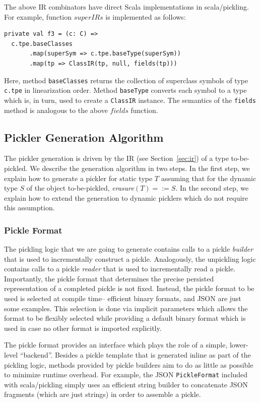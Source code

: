 \documentclass[10pt]{sigplanconf}
\theoremstyle{definition}
\theoremstyle{definition}
\newcommand{\term}[1]{\mbox{\texttt{#1}}}
\begin{document}
The above IR combinators have direct Scala implementations in scala/pickling.
For example, function $superIRs$ is implemented as follows:

\begin{lstlisting}
private val f3 = (c: C) =>
  c.tpe.baseClasses
       .map(superSym => c.tpe.baseType(superSym))
       .map(tp => ClassIR(tp, null, fields(tp)))
\end{lstlisting}
\noindent
Here, method \verb|baseClasses| returns the collection of superclass symbols
of type \verb|c.tpe| in linearization order. Method \verb|baseType| converts
each symbol to a type which is, in turn, used to create a \verb|ClassIR|
instance. The semantics of the \verb|fields| method is analogous to the above
$fields$ function.

\subsection{Pickler Generation Algorithm}

The pickler generation is driven by the IR (see Section~\ref{sec:ir}) of a
type to-be-pickled. We describe the generation algorithm in two steps. In the
first step, we explain how to generate a pickler for static type $T$ assuming
that for the dynamic type $S$ of the object to-be-pickled,
\textit{erasure}$(T) =:= S$. In the second step, we explain how to extend the
generation to dynamic picklers which do not require this assumption.

\subsubsection{Pickle Format}
\label{sec:pickleformat}

The pickling logic that we are going to generate contains calls to a pickle
{\em builder} that is used to incrementally construct a pickle. Analogously,
the unpickling logic contains calls to a pickle {\em reader} that is used to
incrementally read a pickle. Importantly, the pickle format that determines
the precise persisted representation of a completed pickle is not fixed.
Instead, the pickle format to be used is selected at compile time-- efficient
binary formats, and JSON are just some examples. This selection is done via
implicit parameters which allows the format to be flexibly selected while
providing a default binary format which is used in case no other format is
imported explicitly.

The pickle format provides an interface which plays the role of a simple,
lower-level ``backend''. Besides a pickle template that is generated inline as
part of the pickling logic, methods provided by pickle builders aim to do as
little as possible to minimize runtime overhead. For example,  the JSON
\term{PickleFormat} included with scala/pickling simply uses an
efficient string builder to concatenate JSON fragments (which are just
strings) in order to assemble a pickle.
\end{document}
